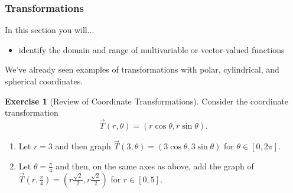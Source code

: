 \documentclass[10pt,]{book}
\theoremstyle{plain}
\theoremstyle{definition}
\theoremstyle{definition}
\theoremstyle{definition}
\theoremstyle{definition}
\newtheorem{exploration}[project]{Exercise}
\theoremstyle{definition}
\numberwithin{equation}{section}
\begin{document}
\subsubsection[{Transformations}]{Transformations}\label{subsubsection-1}
In this section you will... \leavevmode%
\begin{itemize}[label=\textbullet]
\item{}identify the domain and range of multivariable or vector-valued functions%
\end{itemize}
%
\par
We've already seen examples of transformations with polar, cylindrical, and spherical coordinates.%
\begin{exploration}[Review of Coordinate Transformations]\label{exploration-117}
Consider the coordinate transformation%
\begin{equation*}
\vec T(r,\theta) = (r\cos\theta,r\sin\theta).
\end{equation*}
\leavevmode%
\begin{enumerate}
\item\hypertarget{li-67}{}Let \(r=3\) and then graph \(\vec T(3,\theta)=(3\cos\theta,3\sin\theta)\) for \(\theta\in[0,2\pi]\).%
\item\hypertarget{li-68}{}Let \(\theta=\frac{\pi}{4}\) and then, on the same axes as above, add the graph of \(\vec T\left(r,\frac{\pi}{4}\right)=\left(r\frac{\sqrt 2}{2},r \frac{\sqrt 2}{2}\right)\) for \(r\in[0,5]\).%
\end{enumerate}
%
\end{exploration}
\end{document}
